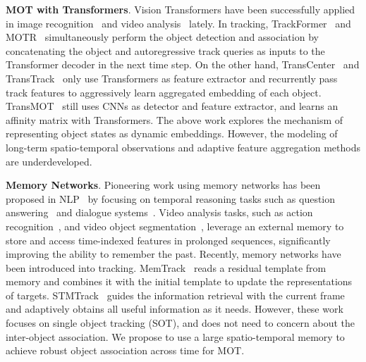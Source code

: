 \vspace{2pt} \noindent \textbf{MOT with Transformers}.
Vision Transformers have been successfully applied in image recognition~\cite{carion2020end,dosovitskiy2020image,zhu2020deformable,liu2021swin} and video analysis~\cite{arnab2021vivit,bertasius2021space,sharir2021image,liu2021video} lately.
In tracking, TrackFormer~\cite{meinhardt2021trackformer} and MOTR~\cite{zeng2021motr} simultaneously perform the object detection and association by concatenating the object and autoregressive
track queries as inputs to the Transformer decoder in the next time step.
On the other hand, TransCenter~\cite{xu2021transcenter} and TransTrack~\cite{sun2020transtrack} only use Transformers as feature extractor and recurrently pass track features to aggressively learn aggregated embedding of each object.
TransMOT~\cite{chu2021transmot} still uses CNNs as detector and feature extractor, and learns an affinity matrix with Transformers.
The above work explores the mechanism of representing object states as dynamic embeddings. However, the modeling of long-term spatio-temporal observations and adaptive feature aggregation methods are underdeveloped.

\vspace{3pt} \noindent \textbf{Memory Networks}.
Pioneering work using memory networks has been proposed in NLP~\cite{graves2014neural,weston2014memory,sukhbaatar2015end} by focusing on temporal reasoning tasks such as question answering~\cite{xiong2016dynamic,kumar2016ask} and dialogue systems~\cite{wu2019global}.
Video analysis tasks, such as action recognition~\cite{wu2019long,xu2021long}, and video object segmentation~\cite{oh2019video,lu2020video}, leverage an external memory to store and access time-indexed features in prolonged sequences, significantly improving the ability to remember the past.
Recently, memory networks have been introduced into tracking.
MemTrack~\cite{yang2018learning} reads a residual template from memory and combines it with the initial template to update the representations of targets.
STMTrack~\cite{fu2021stmtrack} guides the information retrieval with the current frame and adaptively obtains all useful information as it needs.
However, these work focuses on single object tracking (SOT), and does not need to concern about the inter-object association.
We propose to use a large spatio-temporal memory to achieve robust object association across time for MOT.
